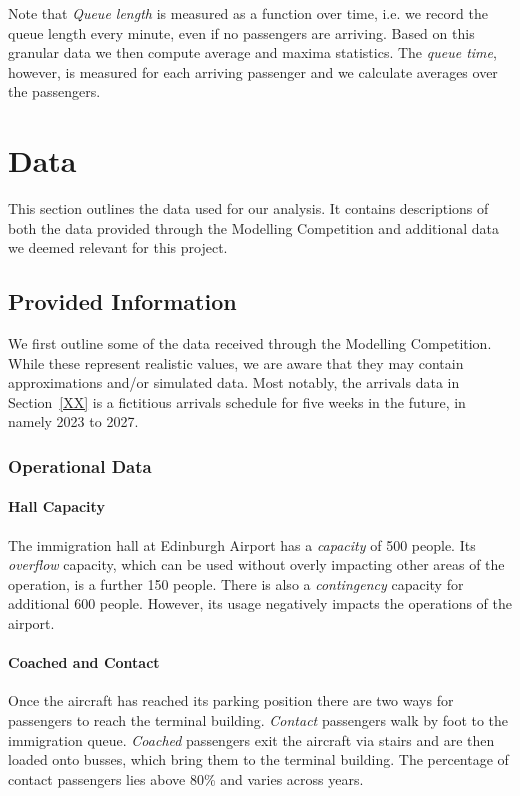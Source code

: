 \documentclass[10pt]{article}
\begin{document}
Note that \textit{Queue length} is measured as a function over time, i.e. we record the queue length every minute, even if no passengers are arriving. Based on this granular data we then compute average and maxima statistics. The \textit{queue time}, however, is measured for each arriving passenger and we calculate averages over the passengers.


\section{Data}
This section outlines the data used for our analysis. It contains descriptions of both the data provided through the Modelling Competition and additional data we deemed relevant for this project.

\subsection{Provided Information}

We first outline some of the data received through the Modelling Competition. While these represent realistic values, we are aware that they may contain approximations and/or simulated data. Most notably, the arrivals data in Section~\ref{XX} is a fictitious arrivals schedule for five weeks in the future, in namely 2023 to 2027. 

\subsubsection{Operational Data}

\paragraph{Hall Capacity}
The immigration hall at Edinburgh Airport has a \textit{capacity} of 500 people. Its \textit{overflow} capacity, which can be used without overly impacting other areas of the operation, is a further 150 people. There is also a \textit{contingency} capacity for additional 600 people. However, its usage negatively impacts the operations of the airport.

\paragraph{Coached and Contact}
Once the aircraft has reached its parking position there are two ways for passengers to reach the terminal building. \textit{Contact} passengers walk by foot to the immigration queue. \textit{Coached} passengers exit the aircraft via stairs and are then loaded onto busses, which bring them to the terminal building. The percentage of contact passengers lies above 80\% and varies across years.
\end{document}
